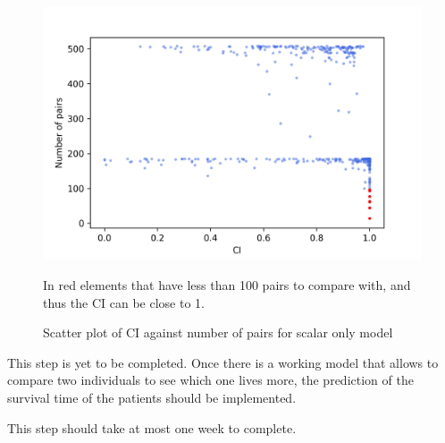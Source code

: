 \begin{figure}
  \centering
  \includegraphics[width=.8\textwidth]{images/results/scatter_scalar}
  \caption{Scatter plot of \acrshort{CI} against number of pairs for scalar only model
  \label{fig:scatter-scalar-CI}
  }

  In red elements that have less than 100 pairs to compare with, and thus the \acrshort{CI} 
  can be close to 1.
\end{figure}


This step is yet to be completed. Once there is a working model that allows to compare two 
individuals to see which one lives more, the prediction of the survival time of the patients 
should be implemented.

This step should take at most one week to complete.

